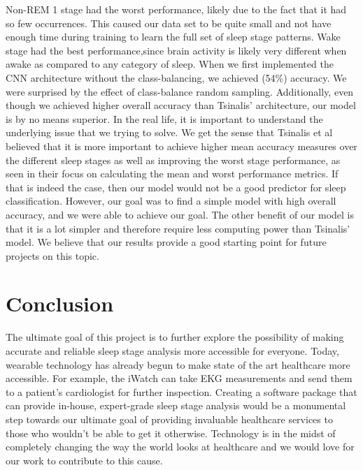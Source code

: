 \documentclass{amia}
\begin{document}
Non-REM 1 stage had the worst performance, likely due to the fact that it had so few occurrences. This caused our data set to be quite small and not have enough time during training to learn the full set of sleep stage patterns. Wake stage had the best performance,since brain activity is likely very different when awake as compared to any category of sleep. When we first implemented the CNN architecture without the class-balancing, we achieved (54\%) accuracy. We were surprised by the effect of class-balance random sampling. Additionally, even though we achieved higher overall accuracy than Tsinalis' architecture, our model is by no means superior. In the real life, it is important to understand the underlying issue that we trying to solve. We get the sense that Tsinalis et al believed that it is more important to achieve higher mean accuracy measures over the different sleep stages as well as improving the worst stage performance, as seen in their focus on calculating the mean and worst performance metrics. If that is indeed the case, then our model would not be a good predictor for sleep classification. However, our goal was to find a simple model with high overall accuracy, and we were able to achieve our goal. The other benefit of our model is that it is a lot simpler and therefore require less computing power than Tsinalis' model. We believe that our results provide a good starting point for future projects on this topic.

\section*{Conclusion}
The ultimate goal of this project is to further explore the possibility of making accurate and reliable sleep stage analysis more accessible for everyone. Today, wearable technology has already begun to make state of the art healthcare more accessible. For example, the iWatch can take EKG measurements and send them to a patient's cardiologist for further inspection. Creating a software package that can provide in-house, expert-grade sleep stage analysis would be a monumental step towards our ultimate goal of providing invaluable healthcare services to those who wouldn't be able to get it otherwise. Technology is in the midst of completely changing the way the world looks at healthcare and we would love for our work to contribute to this cause. 

\clearpage

\makeatletter
\renewcommand{\@biblabel}[1]{\hfill #1.}
\makeatother
\end{document}
